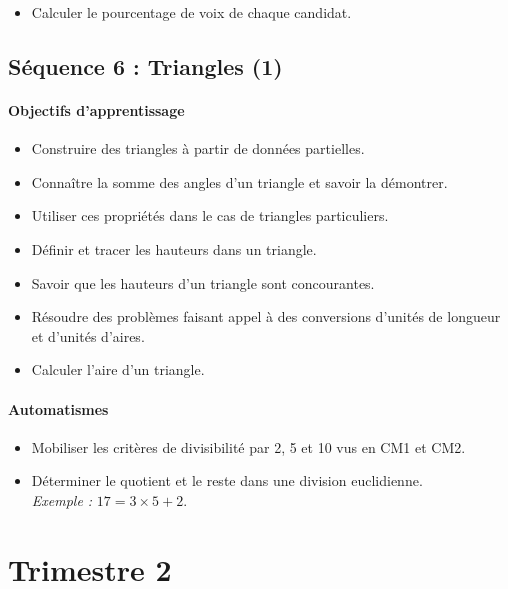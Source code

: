 \documentclass[11pt,a4paper]{article}
\begin{document}
\begin{itemize}[label=\bullet]
    \item[] Calculer le pourcentage de voix de chaque candidat.
\end{itemize}


\subsection*{Séquence 6 : Triangles (1)}

\paragraph{Objectifs d'apprentissage}
\begin{itemize}[label=\bullet]
    \item Construire des triangles à partir de données partielles.
    \item Connaître la somme des angles d'un triangle et savoir la démontrer.
    \item Utiliser ces propriétés dans le cas de triangles particuliers.
    \item Définir et tracer les hauteurs dans un triangle.
    \item Savoir que les hauteurs d'un triangle sont concourantes.
    \item Résoudre des problèmes faisant appel à des conversions d'unités de longueur et d'unités d'aires.
    \item Calculer l'aire d'un triangle.
\end{itemize}

\paragraph{Automatismes}
\begin{itemize}[label=\bullet]
    \item Mobiliser les critères de divisibilité par 2, 5 et 10 vus en CM1 et CM2.
    \item Déterminer le quotient et le reste dans une division euclidienne.\\
    \textit{Exemple :} $17 = 3 \times 5 + 2$.
\end{itemize}

\newpage

\section*{Trimestre 2}
\end{document}
